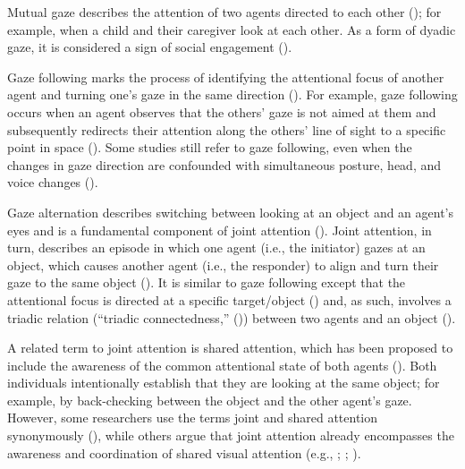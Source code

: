 \documentclass[
]{scrbook}
\begin{document}
Mutual gaze describes the attention of two agents directed to each other (); for example, when a child and their caregiver look at each other. As a form of dyadic gaze, it is considered a sign of social engagement ().

Gaze following marks the process of identifying the attentional focus of another agent and turning one's gaze in the same direction (). For example, gaze following occurs when an agent observes that the others' gaze is not aimed at them and subsequently redirects their attention along the others' line of sight to a specific point in space (). Some studies still refer to gaze following, even when the changes in gaze direction are confounded with simultaneous posture, head, and voice changes ().

Gaze alternation describes switching between looking at an object and an agent's eyes and is a fundamental component of joint attention (). Joint attention, in turn, describes an episode in which one agent (i.e., the initiator) gazes at an object, which causes another agent (i.e., the responder) to align and turn their gaze to the same object (). It is similar to gaze following except that the attentional focus is directed at a specific target/object () and, as such, involves a triadic relation (``triadic connectedness,'' ()) between two agents and an object ().

A related term to joint attention is shared attention, which has been proposed to include the awareness of the common attentional state of both agents (). Both individuals intentionally establish that they are looking at the same object; for example, by back-checking between the object and the other agent's gaze. However, some researchers use the terms joint and shared attention synonymously (), while others argue that joint attention already encompasses the awareness and coordination of shared visual attention (e.g., ; ; ).
\end{document}

